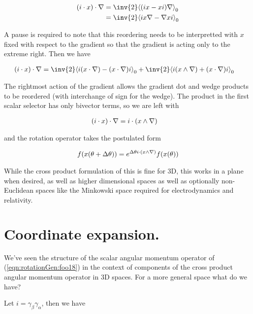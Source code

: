 \begin{align*}
( i \cdot x) \cdot \grad
&=
\inv{2} \gpgradezero{ ( i x - x i) \grad } \\
&=
\inv{2} \gpgradezero{ i x \grad - \grad x i } \\
\end{align*}

A pause is required to note that this reordering needs to be interpretted with $x$ fixed with respect to the gradient so that the gradient is acting only to the extreme right.  Then we have

\begin{align}\label{eqn:rotationGen:foo17}
( i \cdot x) \cdot \grad
&=
\inv{2} \gpgradezero{ i (x \cdot \grad) - (x \cdot \grad) i } + \inv{2} \gpgradezero{ i (x \wedge \grad) + (x \cdot \grad) i } 
\end{align}

The rightmost action of the gradient allows the gradient dot and wedge products to be reordered (with interchange of sign for the wedge).  The product in the first scalar selector has only bivector terms, so we are left with

\begin{align}\label{eqn:rotationGen:foo18}
( i \cdot x) \cdot \nabla
&=
i \cdot (x \wedge \nabla)
\end{align}

and the rotation operator takes the postulated form

\begin{align}\label{eqn:rotationGen:foo19}
f(x(\theta + \Delta\theta)) = e^{\Delta\theta i \cdot (x \wedge \nabla)} f(x(\theta))
\end{align}

While the cross product formulation of this is fine for 3D, this works in a plane when desired, as well as higher dimensional spaces as well as optionally non-Euclidean spaces like the Minkowski space required for electrodynamics and relativity.

\section{Coordinate expansion.}

We've seen the structure of the scalar angular momentum operator of (\ref{eqn:rotationGen:foo18}) in the context of components of the cross product angular momentum operator in 3D spaces.  For a more general space what do we have?

Let $i = \gamma_\beta \gamma_\alpha$, then we have

